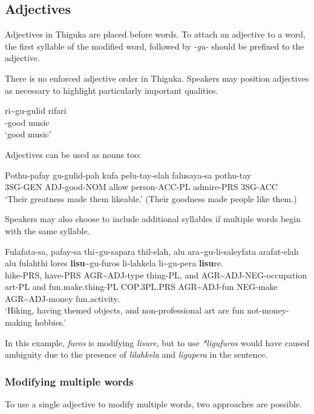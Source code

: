 
\subsection{Adjectives}
Adjectives in Thiguka are placed before words.
To attach an adjective to a word, the first syllable of the modified word, followed by \emph{-gu-} should be prefixed to the adjective.

There is no enforced adjective order in Thiguka. Speakers may position adjectives as necessary to highlight particularly important qualities.

\begin{exe}
    \ex{} \gll{}ri\~{}{}gu-gulid rifari\\
    \agradj{}-good music\\
    \glt{}`good music'
\end{exe}

Adjectives can be used as nouns too:

\begin{exe}
    \ex{} \gll{}Pothu-pafay gu-gulid-pah kufa pelu-tay-elah falusaya-sa pothu-tay\\
    3SG-GEN ADJ-good-NOM allow person-ACC-PL admire-PRS 3SG-ACC\\
    \glt{}`Their greatness made them likeable.' (Their goodness made people like them.)
\end{exe}

Speakers may also choose to include additional syllables if multiple words begin with the same syllable.
\begin{exe}
    \ex{} \gll{}Fulafata-sa, pafay-sa thi\~{}gu-sapara thil-elah, alu ara\~{}gu-li-saleyfata arafat-elah alu fulahthi lores \textbf{lisu}\~{}gu-furos li-lahkela li\~{}gu-pera \textbf{lisu}re.\\
    hike-PRS, have-PRS AGR\~{}ADJ-type thing-PL, and AGR\~{}ADJ-NEG-occupation art-PL and fun.make.thing-PL COP.3PL.PRS AGR\~{}ADJ-fun NEG-make AGR\~{}ADJ-money fun.activity.\\
    \glt{}`Hiking, having themed objects, and non-professional art are fun not-money-making hobbies.'
\end{exe}    

In this example, \textit{furos} is modifying \textit{lisure}, but to use \textit{*ligufuros} would have caused ambiguity due to the presence of \textit{lilahkela} and \textit{ligupera} in the sentence.

\subsubsection{Modifying multiple words}
To use a single adjective to modify multiple words, two approaches are possible.

